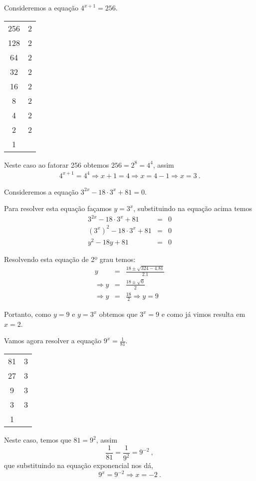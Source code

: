  \begin{exem}
  Consideremos a equação $4^{x+1}= 256$.

  \begin{tabular}{c|c}
   256 & 2 \\
   128 & 2 \\
   64  & 2 \\
   32  & 2 \\
   16  & 2 \\
   8   & 2 \\
   4   & 2 \\
   2   & 2 \\
   1   &   \\
  \end{tabular}

  Neste caso ao fatorar 256 obtemos $256=2^8 =4^4$, assim
  \begin{eqnarray*}
  4^{x+1}= 4^4 \Rightarrow x+1= 4 \Rightarrow x= 4-1 \Rightarrow x=3 \ .
  \end{eqnarray*}

 \end{exem}

 \begin{exem}
  Consideremos a equação $3^{2x}- 18\cdot 3^x + 81=0$.

  Para resolver esta equação façamos $y= 3^x$, substituindo na equação acima temos
  \begin{eqnarray*}
   3^{2x} - 18\cdot 3^x + 81&=& 0 \\
   (3^x)^2 - 18\cdot 3^x + 81&=& 0 \\
   y^2 - 18y + 81 &=& 0
  \end{eqnarray*}

  Resolvendo esta equação de 2º grau temos:
  \begin{eqnarray*}
   y &=& \frac{18 \pm \sqrt{324 - 4.81}}{2.1} \\
   \Rightarrow y&=& \frac{18 \pm \sqrt{0}}{2} \\
   \Rightarrow y&=& \frac{18}{2} \Rightarrow y= 9
  \end{eqnarray*}

  Portanto, como $y= 9$ e $y= 3^x$ obtemos que $3^x= 9$ e como já vimos resulta em $x= 2$.

 \end{exem}

 \begin{exem}
  Vamos agora resolver a equação $9^x= \frac{1}{81}$.

  \begin{tabular}{c|c}
   81 & 3 \\
   27 & 3 \\
   9  & 3 \\
   3  & 3 \\
   1  &   \\
  \end{tabular}

  Neste caso, temos que $81= 9^2$, assim
  \[\frac{1}{81}= \frac{1}{9^2}= 9^{-2} \ ,\]
  que substituindo na equação exponencial nos dá,
  \[9^x= 9^{-2} \Rightarrow x= -2 \ .\]
 \end{exem}

